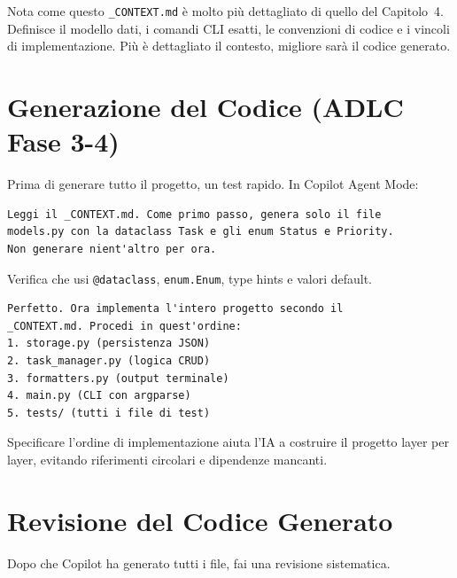 \begin{notebox}
Nota come questo \texttt{\_CONTEXT.md} è molto più dettagliato di quello del Capitolo~4. Definisce il modello dati, i comandi CLI esatti, le convenzioni di codice e i vincoli di implementazione. Più è dettagliato il contesto, migliore sarà il codice generato.
\end{notebox}

\section{Generazione del Codice (ADLC Fase 3-4)}

\begin{praticabox}[title={Pratica --- Fase 3: Proof of Value}]
Prima di generare tutto il progetto, un test rapido. In Copilot Agent Mode:
\begin{lstlisting}[language={}]
Leggi il _CONTEXT.md. Come primo passo, genera solo il file
models.py con la dataclass Task e gli enum Status e Priority.
Non generare nient'altro per ora.
\end{lstlisting}
Verifica che usi \texttt{@dataclass}, \texttt{enum.Enum}, type hints e valori default.
\end{praticabox}

\begin{praticabox}[title={Pratica --- Fase 4: Generazione completa}]
\begin{lstlisting}[language={}]
Perfetto. Ora implementa l'intero progetto secondo il
_CONTEXT.md. Procedi in quest'ordine:
1. storage.py (persistenza JSON)
2. task_manager.py (logica CRUD)
3. formatters.py (output terminale)
4. main.py (CLI con argparse)
5. tests/ (tutti i file di test)
\end{lstlisting}
\end{praticabox}

\begin{tipbox}
Specificare l'ordine di implementazione aiuta l'IA a costruire il progetto layer per layer, evitando riferimenti circolari e dipendenze mancanti.
\end{tipbox}

\section{Revisione del Codice Generato}

Dopo che Copilot ha generato tutti i file, fai una revisione sistematica.

